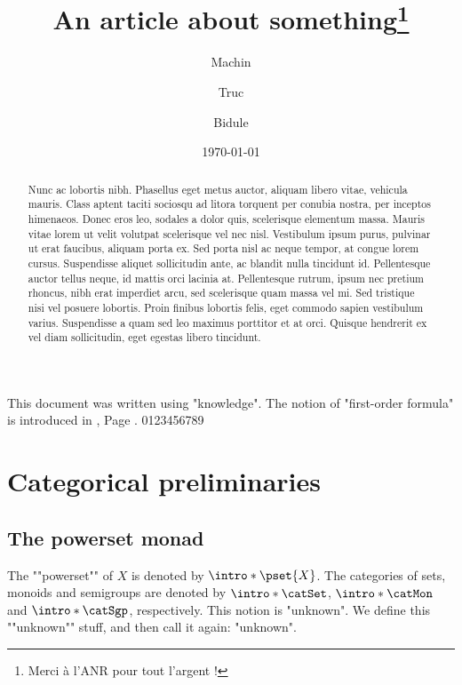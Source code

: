 \documentclass{fancy-article}
\title{An article about something\thanks{Merci à l'ANR pour tout l'argent !}}
\author[1]{Machin}
\author[2]{Truc}
\author[1]{Bidule}
\affil[1]{Institut du Fromage}
\affil[2]{Baguette Université Sorbonne-Est}
\date{\today}
\begin{document}
\maketitle

\begin{abstract}
  Nunc ac lobortis nibh. Phasellus eget metus auctor, aliquam libero vitae, vehicula mauris. Class aptent taciti sociosqu ad litora torquent per conubia nostra, per inceptos himenaeos. Donec eros leo, sodales a dolor quis, scelerisque elementum massa. Mauris vitae lorem ut velit volutpat scelerisque vel nec nisl. Vestibulum ipsum purus, pulvinar ut erat faucibus, aliquam porta ex. Sed porta nisl ac neque tempor, at congue lorem cursus. Suspendisse aliquet sollicitudin ante, ac blandit nulla tincidunt id. Pellentesque auctor tellus neque, id mattis orci lacinia at. Pellentesque rutrum, ipsum nec pretium rhoncus, nibh erat imperdiet arcu, sed scelerisque quam massa vel mi. Sed tristique nisi vel posuere lobortis. Proin finibus lobortis felis, eget commodo sapien vestibulum varius. Suspendisse a quam sed leo maximus porttitor et at orci. Quisque hendrerit ex vel diam sollicitudin, eget egestas libero tincidunt. 
\end{abstract}

This document was written using "knowledge".
The notion of "first-order formula" is introduced in
, Page .
0123456789

\section{Categorical preliminaries}
 
\subsection{The powerset monad}

\AP The ""powerset"" of $X$ is denoted by $\intro*\pset{X}$. The categories
of sets, monoids and semigroups are denoted by $\intro*\catSet$,
$\intro*\catMon$ and $\intro*\catSgp$, respectively.
This notion is "unknown". We define this ""unknown"" stuff, and then call it again: "unknown".
\end{document}
